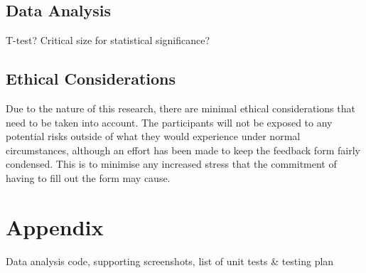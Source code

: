 \documentclass[lettersize,journal]{IEEEtran}
\begin{document}
    \subsection{Data Analysis}
        T-test? Critical size for statistical significance?

    \subsection{Ethical Considerations}
        Due to the nature of this research, there are minimal ethical considerations that need to be taken into account. The participants will not be exposed to any potential risks outside of what they would experience under normal circumstances, although an effort has been made to keep the feedback form fairly condensed. This is to minimise any increased stress that the commitment of having to fill out the form may cause.
    
    \section{Appendix}
    Data analysis code, supporting screenshots, list of unit tests \& testing plan







\end{document}
